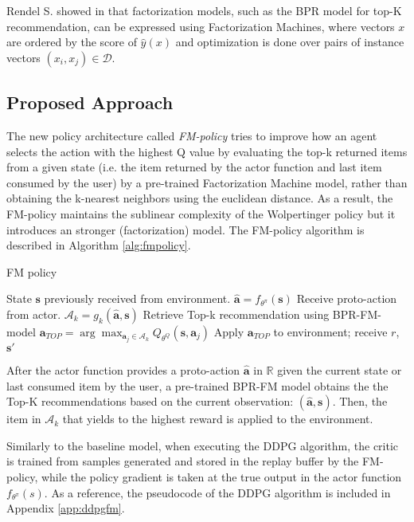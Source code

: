 Rendel S. showed in \cite{rendle2012factorization} that factorization models, such as the BPR model for top-K recommendation, can be expressed using Factorization Machines, where vectors $x$ are ordered by the score of $\hat{y}(x)$ and optimization is done over pairs of instance vectors $(x_i, x_j) \in \mathcal{D}$.

\subsection{Proposed Approach}

The new policy architecture called \textit{FM-policy} tries to improve how an agent selects the action with the highest Q value by evaluating the top-k returned items from a given state (i.e. the item returned by the actor function and last item consumed by the user) by a pre-trained Factorization Machine model, rather than obtaining the k-nearest neighbors using the euclidean distance. As a result, the FM-policy maintains the sublinear complexity of the Wolpertinger policy but it introduces an stronger (factorization) model. The FM-policy algorithm is described in Algorithm \ref{alg:fmpolicy}.

\begin{center}
 \begin{algorithm}[t]
    \SetAlgoLined\DontPrintSemicolon
    \caption{FM policy}
    \label{alg:fmpolicy}
    
    State $\mathbf{s}$ previously received from environment.\;
    $\hat{\mathbf{a}} = f_{\theta^{\pi}}(\mathbf{s})$ {Receive proto-action from actor}.\;
    $\mathcal{A}_k = g_k(\hat{\mathbf{a}}, \mathbf{s})$ {Retrieve Top-k recommendation using BPR-FM-model}\;
    $\mathbf{a}_{TOP} = \arg \max_{\mathbf{a}_j \in \mathcal{A}_k} Q_{\theta^{Q}}(\mathbf{s}, \mathbf{a}_j)$\;
    Apply $\mathbf{a}_{TOP}$ to environment; receive $r$, $\mathbf{s}'$\;
  \end{algorithm}
\end{center}
After the actor function provides a proto-action $\hat{\mathbf{a}}$ in $\mathbb{R}$ given the current state or last consumed item by the user, a pre-trained BPR-FM model obtains the the Top-K recommendations based on the current observation: $(\hat{\mathbf{a}}, \mathbf{s})$. Then, the item in $\mathcal{A}_k$ that yields to the highest reward is applied to the environment.

Similarly to the baseline model, when executing the DDPG algorithm, the critic is trained from samples generated and stored in the replay buffer by the FM-policy, while the policy gradient is taken at the true output in the actor function $f_{\theta^{\pi}}(s)$. As a reference, the pseudocode of the DDPG algorithm is included in Appendix \ref{app:ddpgfm}.